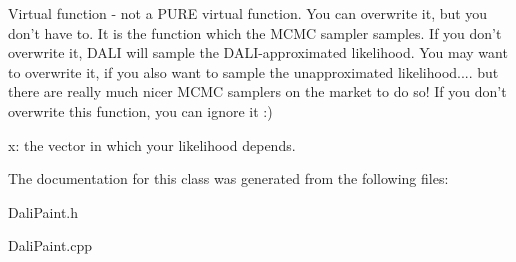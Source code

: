 Virtual function -\/ not a P\-U\-R\-E virtual function. You can overwrite it, but you don't have to. It is the function which the M\-C\-M\-C sampler samples. If you don't overwrite it, D\-A\-L\-I will sample the D\-A\-L\-I-\/approximated likelihood. You may want to overwrite it, if you also want to sample the unapproximated likelihood.... but there are really much nicer M\-C\-M\-C samplers on the market to do so! If you don't overwrite this function, you can ignore it \-:)
\begin{DoxyItemize}
\item x\-: the vector in which your likelihood depends. 
\end{DoxyItemize}

The documentation for this class was generated from the following files\-:\begin{DoxyCompactItemize}
\item 
Dali\-Paint.\-h\item 
Dali\-Paint.\-cpp\end{DoxyCompactItemize}
